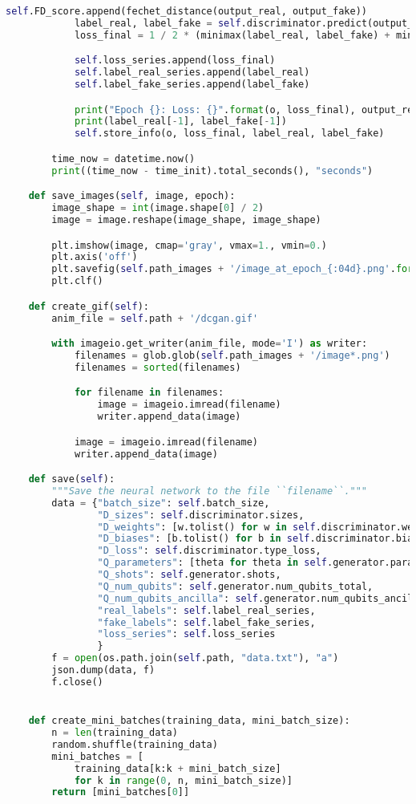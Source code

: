 \begin{lstlisting}[language=Python, caption=Codi per la definició del model]
			self.FD_score.append(fechet_distance(output_real, output_fake))
			label_real, label_fake = self.discriminator.predict(output_real), self.discriminator.predict(output_fake)
			loss_final = 1 / 2 * (minimax(label_real, label_fake) + minimax(label_real, label_fake))

			self.loss_series.append(loss_final)
			self.label_real_series.append(label_real)
			self.label_fake_series.append(label_fake)

			print("Epoch {}: Loss: {}".format(o, loss_final), output_real, output_fake)
			print(label_real[-1], label_fake[-1])
			self.store_info(o, loss_final, label_real, label_fake)

		time_now = datetime.now()
		print((time_now - time_init).total_seconds(), "seconds")

	def save_images(self, image, epoch):
		image_shape = int(image.shape[0] / 2)
		image = image.reshape(image_shape, image_shape)

		plt.imshow(image, cmap='gray', vmax=1., vmin=0.)
		plt.axis('off')
		plt.savefig(self.path_images + '/image_at_epoch_{:04d}.png'.format(epoch))
		plt.clf()

	def create_gif(self):
		anim_file = self.path + '/dcgan.gif'

		with imageio.get_writer(anim_file, mode='I') as writer:
			filenames = glob.glob(self.path_images + '/image*.png')
			filenames = sorted(filenames)

			for filename in filenames:
				image = imageio.imread(filename)
				writer.append_data(image)

			image = imageio.imread(filename)
			writer.append_data(image)

	def save(self):
		"""Save the neural network to the file ``filename``."""
		data = {"batch_size": self.batch_size,
				"D_sizes": self.discriminator.sizes,
				"D_weights": [w.tolist() for w in self.discriminator.weights],
				"D_biases": [b.tolist() for b in self.discriminator.biases],
				"D_loss": self.discriminator.type_loss,
				"Q_parameters": [theta for theta in self.generator.parameter_values],
				"Q_shots": self.generator.shots,
				"Q_num_qubits": self.generator.num_qubits_total,
				"Q_num_qubits_ancilla": self.generator.num_qubits_ancilla,
				"real_labels": self.label_real_series,
				"fake_labels": self.label_fake_series,
				"loss_series": self.loss_series
				}
		f = open(os.path.join(self.path, "data.txt"), "a")
		json.dump(data, f)
		f.close()


	def create_mini_batches(training_data, mini_batch_size):
		n = len(training_data)
		random.shuffle(training_data)
		mini_batches = [
			training_data[k:k + mini_batch_size]
			for k in range(0, n, mini_batch_size)]
		return [mini_batches[0]]



\end{lstlisting}
